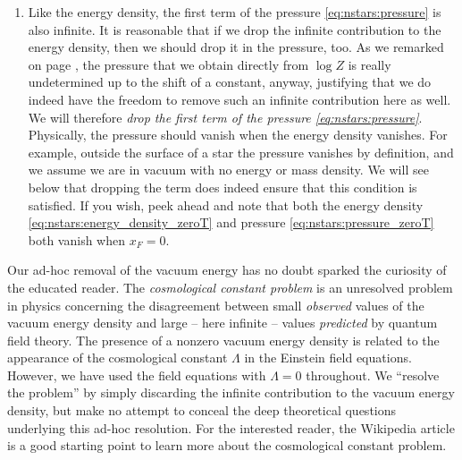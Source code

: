 \begin{enumerate}
\item
Like the energy density, the first term of the pressure \eqref{eq:nstars:pressure} is also infinite.
It is reasonable that if we drop the infinite contribution to the energy density, then we should drop it in the pressure, too.
As we remarked on page \pageref{tft:pressure_renormalization_discussion}, the pressure that we obtain directly from $\log Z$ is really undetermined up to the shift of a constant, anyway, justifying that we do indeed have the freedom to remove such an infinite contribution here as well.
We will therefore \emph{drop the first term of the pressure \eqref{eq:nstars:pressure}}.
Physically, the pressure should vanish when the energy density vanishes.
For example, outside the surface of a star the pressure vanishes by definition, and we assume we are in vacuum with no energy or mass density.
We will see below that dropping the term does indeed ensure that this condition is satisfied.
If you wish, peek ahead and note that both the energy density \eqref{eq:nstars:energy_density_zeroT} and pressure \eqref{eq:nstars:pressure_zeroT} both vanish when $x_F = 0$.

\end{enumerate}

Our ad-hoc removal of the vacuum energy has no doubt sparked the curiosity of the educated reader.
The \emph{cosmological constant problem} is an unresolved problem in physics concerning the disagreement between small \emph{observed} values of the vacuum energy density and large -- here infinite -- values \emph{predicted} by quantum field theory.
The presence of a nonzero vacuum energy density is related to the appearance of the cosmological constant $\Lambda$ in the Einstein field equations.
However, we have used the field equations with $\Lambda = 0$ throughout.
We ``resolve the problem'' by simply discarding the infinite contribution to the vacuum energy density, but make no attempt to conceal the deep theoretical questions underlying this ad-hoc resolution.
For the interested reader, the Wikipedia article \cite{ref:wiki_cosmological_constant_problem} is a good starting point to learn more about the cosmological constant problem.

